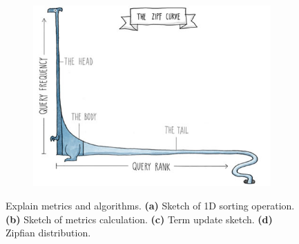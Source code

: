 \begin{figure}[!htb]
\begin{subfigure}[t]{0.4\textwidth}
			\label{fig:pg_sgd_update_sketch}
		\end{subfigure}
		\begin{subfigure}[t]{0.4\textwidth}
			\centering
			\caption{}
			\includegraphics[width=\linewidth]{fig/algorithm/TODO_zipf_curve.jpg}
			\label{fig:fig:zipf_curve}
		\end{subfigure}
	\caption{
		Explain metrics and algorithms.
		\textbf{(a)} Sketch of 1D sorting operation. \textbf{(b)} Sketch of metrics calculation. \textbf{(c)} Term update sketch. \textbf{(d)} Zipfian distribution.
	}
	\label{fig:algorithm}
\end{figure}
